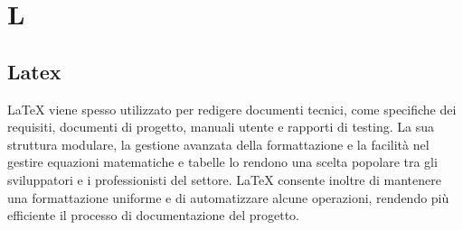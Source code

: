 \section{L}
\subsection{Latex}
LaTeX viene spesso utilizzato per redigere documenti tecnici, come specifiche
dei requisiti, documenti di progetto, manuali utente e rapporti di testing. La
sua struttura modulare, la gestione avanzata della formattazione e la facilità
nel gestire equazioni matematiche e tabelle lo rendono una scelta popolare tra
gli sviluppatori e i professionisti del settore. LaTeX consente inoltre di
mantenere una formattazione uniforme e di automatizzare alcune operazioni,
rendendo più efficiente il processo di documentazione del progetto.
